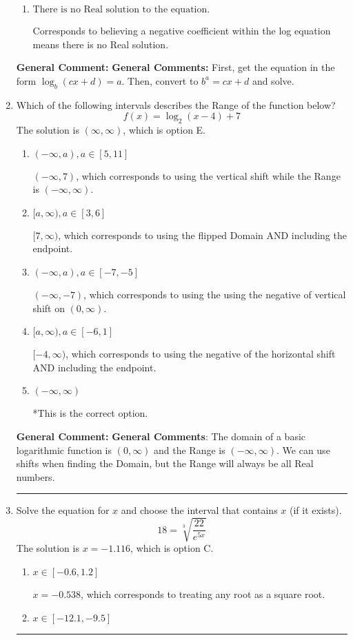 \documentclass{extbook}[14pt]
\newcommand{\litem}[1]{\item #1

\rule{\textwidth}{0.4pt}}
\begin{document}
\begin{enumerate}
{\begin{enumerate}[label=\Alph*.]
$x = -1.000$, which corresponds to reversing the base and exponent when converting.
\item \( \text{There is no Real solution to the equation.} \)

Corresponds to believing a negative coefficient within the log equation means there is no Real solution.
\end{enumerate}

\textbf{General Comment:} \textbf{General Comments:} First, get the equation in the form $\log_b{(cx+d)} = a$. Then, convert to $b^a = cx+d$ and solve.
}
\litem{
Which of the following intervals describes the Range of the function below?
\[ f(x) = \log_2{(x-4)}+7 \]
The solution is \( (\infty, \infty) \), which is option E.\begin{enumerate}[label=\Alph*.]
\item \( (-\infty, a), a \in [5, 11] \)

$(-\infty, 7)$, which corresponds to using the vertical shift while the Range is $(-\infty, \infty)$.
\item \( [a, \infty), a \in [3, 6] \)

$[7, \infty)$, which corresponds to using the flipped Domain AND including the endpoint.
\item \( (-\infty, a), a \in [-7, -5] \)

$(-\infty, -7)$, which corresponds to using the using the negative of vertical shift on $(0, \infty)$.
\item \( [a, \infty), a \in [-6, 1] \)

$[-4, \infty)$, which corresponds to using the negative of the horizontal shift AND including the endpoint.
\item \( (-\infty, \infty) \)

*This is the correct option.
\end{enumerate}

\textbf{General Comment:} \textbf{General Comments}: The domain of a basic logarithmic function is $(0, \infty)$ and the Range is $(-\infty, \infty)$. We can use shifts when finding the Domain, but the Range will always be all Real numbers.
}
\litem{
 Solve the equation for $x$ and choose the interval that contains $x$ (if it exists).
\[  18 = \sqrt[3]{\frac{22}{e^{5x}}} \]
The solution is \( x = -1.116 \), which is option C.\begin{enumerate}[label=\Alph*.]
\item \( x \in [-0.6, 1.2] \)

$x = -0.538$, which corresponds to treating any root as a square root.
\item \( x \in [-12.1, -9.5] \)


\end{enumerate}}
\end{enumerate}
\end{document}
